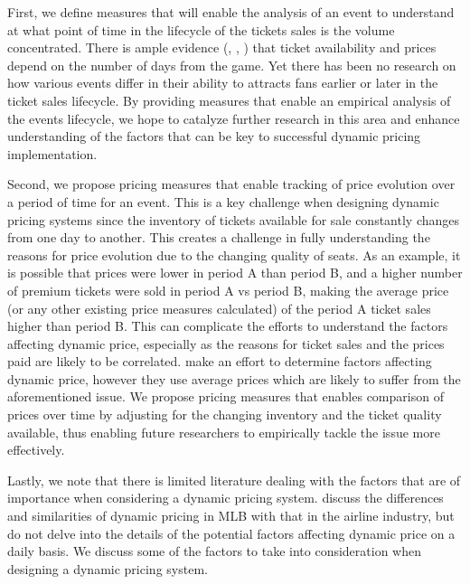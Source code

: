 \documentclass[letterpaper, 12pt]{article}
\begin{document}
First, we define measures that will enable the analysis of an event to understand at what point of time in the lifecycle of the tickets sales is the volume concentrated. There is ample evidence (\cite{drayer2009value}, \cite{shapiro2012new}, \cite{kemper2015factors}) that ticket availability and prices depend on the number of days from the game. Yet there has been no research on how various events differ in their ability to attracts fans earlier or later in the ticket sales lifecycle. By providing measures that enable an empirical analysis of the events lifecycle, we hope to catalyze further research in this area and enhance understanding of the factors that can be key to successful dynamic pricing implementation.

Second, we propose pricing measures that enable tracking of price evolution over a period of time for an event. This is a key challenge when designing dynamic pricing systems since the inventory of tickets available for sale constantly changes from one day to another. This creates a challenge in fully understanding the reasons for price evolution due to the changing quality of seats. As an example, it is possible that prices were lower in period A than period B, and a higher number of premium tickets were sold in period A vs period B, making the average price (or any other existing price measures calculated) of the period A ticket sales higher than period B. This can complicate the efforts to understand the factors affecting dynamic price, especially as the reasons for ticket sales and the prices paid are likely to be correlated. \cite{paul2013determinants} make an effort to determine factors affecting dynamic price, however they use average prices which are likely to suffer from the aforementioned issue. We propose pricing measures that enables comparison of prices over time by adjusting for the changing inventory and the ticket quality available, thus enabling future researchers to empirically tackle the issue more effectively.

Lastly, we note that there is limited literature dealing with the factors that are of importance when considering a dynamic pricing system. \cite{drea2017dynamic} discuss the differences and similarities of dynamic pricing in MLB with that in the airline industry, but do not delve into the details of the potential factors affecting dynamic price on a daily basis. We discuss some of the factors to take into consideration when designing a dynamic pricing system.
\end{document}
